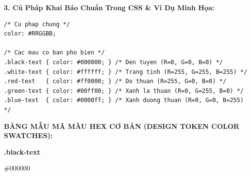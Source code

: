 \documentclass[11pt,oneside]{book}
\begin{document}
\textbf{3. Cú Pháp Khai Báo Chuẩn Trong CSS \& Ví Dụ Minh Họa:}
\begin{codeWindow}
\begin{lstlisting}[language=CSS3]
/* Cu phap chung */
color: #RRGGBB;

/* Cac mau co ban pho bien */
.black-text { color: #000000; } /* Den tuyen (R=0, G=0, B=0) */
.white-text { color: #ffffff; } /* Trang tinh (R=255, G=255, B=255) */
.red-text   { color: #ff0000; } /* Do thuan (R=255, G=0, B=0) */
.green-text { color: #00ff00; } /* Xanh la thuan (R=0, G=255, B=0) */
.blue-text  { color: #0000ff; } /* Xanh duong thuan (R=0, G=0, B=255) */
\end{lstlisting}
\end{codeWindow}

\begin{browserWindow}
\sffamily\small
\begin{tcolorbox}[enhanced, colback=white, colframe=primaryBlue!25, arc=6pt, boxrule=0.8pt, top=8pt, bottom=8pt, left=10pt, right=10pt]
  \textcolor{gray!80!black}{\scriptsize\bfseries BẢNG MẪU MÃ MÀU HEX CƠ BẢN (DESIGN TOKEN COLOR SWATCHES):}\par\vspace{6pt}
  \begin{tcbraster}[raster columns=5, raster equal height=rows, raster column skip=5pt]
    \begin{tcolorbox}[enhanced, colback=slateBg, colframe=gray!30, arc=4pt, boxrule=0.6pt, halign=center, top=4pt, bottom=4pt, left=2pt, right=2pt]
      \begin{tcolorbox}[colback=black, colframe=black, arc=3pt, boxrule=0pt, height=0.7cm, top=0pt, bottom=0pt]{}\end{tcolorbox}
      \vspace{2pt}
      \textcolor{darkText}{\tiny\bfseries .black-text}\par
      \textcolor{primaryBlue}{\tiny\ttfamily \#000000}
    \end{tcolorbox}
    \begin{tcolorbox}[enhanced, colback=slateBg, colframe=gray!30, arc=4pt, boxrule=0.6pt, halign=center, top=4pt, bottom=4pt, left=2pt, right=2pt]
      \begin{tcolorbox}[colback=white, colframe=gray!40, arc=3pt, boxrule=0.5pt, height=0.7cm, top=0pt, bottom=0pt]{}\end{tcolorbox}
      \vspace{2pt}

\end{tcolorbox}
\end{tcbraster}
\end{tcolorbox}
\end{browserWindow}
\end{document}
